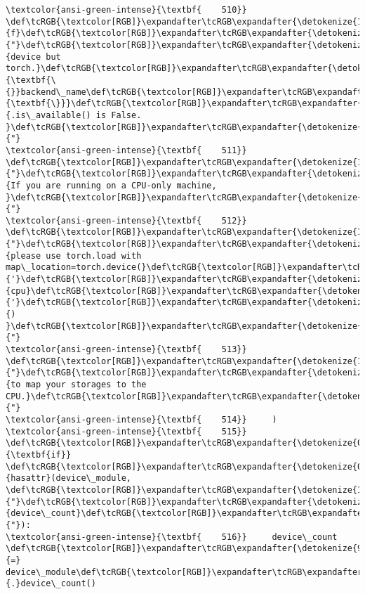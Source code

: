 \documentclass[11pt]{article}
\begin{document}
\begin{Verbatim}[commandchars=\\\{\}, frame=single, framerule=2mm, rulecolor=\color{outerrorbackground}]
\textcolor{ansi-green-intense}{\textbf{    510}}         \def\tcRGB{\textcolor[RGB]}\expandafter\tcRGB\expandafter{\detokenize{175,0,0}}{f}\def\tcRGB{\textcolor[RGB]}\expandafter\tcRGB\expandafter{\detokenize{175,0,0}}{"}\def\tcRGB{\textcolor[RGB]}\expandafter\tcRGB\expandafter{\detokenize{175,0,0}}{device but torch.}\def\tcRGB{\textcolor[RGB]}\expandafter\tcRGB\expandafter{\detokenize{175,95,135}}{\textbf{\{}}backend\_name\def\tcRGB{\textcolor[RGB]}\expandafter\tcRGB\expandafter{\detokenize{175,95,135}}{\textbf{\}}}\def\tcRGB{\textcolor[RGB]}\expandafter\tcRGB\expandafter{\detokenize{175,0,0}}{.is\_available() is False. }\def\tcRGB{\textcolor[RGB]}\expandafter\tcRGB\expandafter{\detokenize{175,0,0}}{"}
\textcolor{ansi-green-intense}{\textbf{    511}}         \def\tcRGB{\textcolor[RGB]}\expandafter\tcRGB\expandafter{\detokenize{175,0,0}}{"}\def\tcRGB{\textcolor[RGB]}\expandafter\tcRGB\expandafter{\detokenize{175,0,0}}{If you are running on a CPU-only machine, }\def\tcRGB{\textcolor[RGB]}\expandafter\tcRGB\expandafter{\detokenize{175,0,0}}{"}
\textcolor{ansi-green-intense}{\textbf{    512}}         \def\tcRGB{\textcolor[RGB]}\expandafter\tcRGB\expandafter{\detokenize{175,0,0}}{"}\def\tcRGB{\textcolor[RGB]}\expandafter\tcRGB\expandafter{\detokenize{175,0,0}}{please use torch.load with map\_location=torch.device(}\def\tcRGB{\textcolor[RGB]}\expandafter\tcRGB\expandafter{\detokenize{175,0,0}}{'}\def\tcRGB{\textcolor[RGB]}\expandafter\tcRGB\expandafter{\detokenize{175,0,0}}{cpu}\def\tcRGB{\textcolor[RGB]}\expandafter\tcRGB\expandafter{\detokenize{175,0,0}}{'}\def\tcRGB{\textcolor[RGB]}\expandafter\tcRGB\expandafter{\detokenize{175,0,0}}{) }\def\tcRGB{\textcolor[RGB]}\expandafter\tcRGB\expandafter{\detokenize{175,0,0}}{"}
\textcolor{ansi-green-intense}{\textbf{    513}}         \def\tcRGB{\textcolor[RGB]}\expandafter\tcRGB\expandafter{\detokenize{175,0,0}}{"}\def\tcRGB{\textcolor[RGB]}\expandafter\tcRGB\expandafter{\detokenize{175,0,0}}{to map your storages to the CPU.}\def\tcRGB{\textcolor[RGB]}\expandafter\tcRGB\expandafter{\detokenize{175,0,0}}{"}
\textcolor{ansi-green-intense}{\textbf{    514}}     )
\textcolor{ansi-green-intense}{\textbf{    515}} \def\tcRGB{\textcolor[RGB]}\expandafter\tcRGB\expandafter{\detokenize{0,135,0}}{\textbf{if}} \def\tcRGB{\textcolor[RGB]}\expandafter\tcRGB\expandafter{\detokenize{0,135,0}}{hasattr}(device\_module, \def\tcRGB{\textcolor[RGB]}\expandafter\tcRGB\expandafter{\detokenize{175,0,0}}{"}\def\tcRGB{\textcolor[RGB]}\expandafter\tcRGB\expandafter{\detokenize{175,0,0}}{device\_count}\def\tcRGB{\textcolor[RGB]}\expandafter\tcRGB\expandafter{\detokenize{175,0,0}}{"}):
\textcolor{ansi-green-intense}{\textbf{    516}}     device\_count \def\tcRGB{\textcolor[RGB]}\expandafter\tcRGB\expandafter{\detokenize{98,98,98}}{=} device\_module\def\tcRGB{\textcolor[RGB]}\expandafter\tcRGB\expandafter{\detokenize{98,98,98}}{.}device\_count()


\end{Verbatim}
\end{document}
